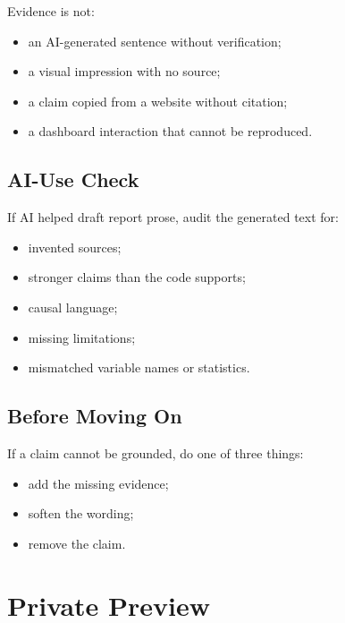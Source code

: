 \documentclass[
  letterpaper,
  DIV=11,
  numbers=noendperiod,
  oneside]{scrreprt}
\providecommand{\tightlist}{%
  \setlength{\itemsep}{0pt}\setlength{\parskip}{0pt}}
\begin{document}
Evidence is not:

\begin{itemize}
\tightlist
\item
  an AI-generated sentence without verification;
\item
  a visual impression with no source;
\item
  a claim copied from a website without citation;
\item
  a dashboard interaction that cannot be reproduced.
\end{itemize}

\section*{AI-Use Check}\label{ai-use-check}


If AI helped draft report prose, audit the generated text for:

\begin{itemize}
\tightlist
\item
  invented sources;
\item
  stronger claims than the code supports;
\item
  causal language;
\item
  missing limitations;
\item
  mismatched variable names or statistics.
\end{itemize}

\section*{Before Moving On}\label{before-moving-on}


If a claim cannot be grounded, do one of three things:

\begin{itemize}
\tightlist
\item
  add the missing evidence;
\item
  soften the wording;
\item
  remove the claim.
\end{itemize}

\chapter*{Private Preview}\label{private-preview}
\end{document}
